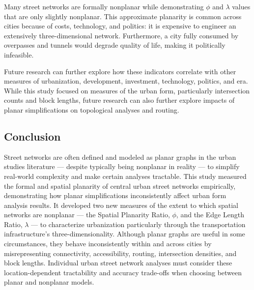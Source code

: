 \documentclass[Afour,sageh,times]{sagej}
\begin{document}
Many street networks are formally nonplanar while demonstrating $\phi$ and $\lambda$ values that are only slightly nonplanar. This approximate planarity is common across cities because of costs, technology, and politics: it is expensive to engineer an extensively three-dimensional network. Furthermore, a city fully consumed by overpasses and tunnels would degrade quality of life, making it politically infeasible.

Future research can further explore how these indicators correlate with other measures of urbanization, development, investment, technology, politics, and era. While this study focused on measures of the urban form, particularly intersection counts and block lengths, future research can also further explore impacts of planar simplifications on topological analyses and routing.

\subsection{Conclusion}

Street networks are often defined and modeled as planar graphs in the urban studies literature --- despite typically being nonplanar in reality --- to simplify real-world complexity and make certain analyses tractable. This study measured the formal and spatial planarity of central urban street networks empirically, demonstrating how planar simplifications inconsistently affect urban form analysis results. It developed two new measures of the extent to which spatial networks are nonplanar --- the Spatial Planarity Ratio, $\phi$, and the Edge Length Ratio, $\lambda$ ---  to characterize urbanization particularly through the transportation infrastructure's three-dimensionality. Although planar graphs are useful in some circumstances, they behave inconsistently within and across cities by misrepresenting connectivity, accessibility, routing, intersection densities, and block lengths. Individual urban street network analyses must consider these location-dependent tractability and accuracy trade-offs when choosing between planar and nonplanar models.




\end{document}
